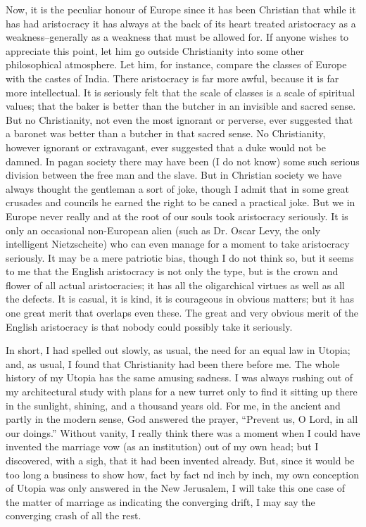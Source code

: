 \documentclass{book}
\begin{document}
Now, it is the peculiar honour of Europe since it has been Christian that while it has had aristocracy it has always at the back of its heart treated aristocracy as a weakness–generally as a weakness that must be allowed for. If anyone wishes to appreciate this point, let him go outside Christianity into some other philosophical atmosphere. Let him, for instance, compare the classes of Europe with the castes of India. There aristocracy is far more awful, because it is far more intellectual. It is seriously felt that the scale of classes is a scale of spiritual values; that the baker is better than the butcher in an invisible and sacred sense. But no Christianity, not even the most ignorant or perverse, ever suggested that a baronet was better than a butcher in that sacred sense. No Christianity, however ignorant or extravagant, ever suggested that a duke would not be damned. In pagan society there may have been (I do not know) some such serious division between the free man and the slave. But in Christian society we have always thought the gentleman a sort of joke, though I admit that in some great crusades and councils he earned the right to be caned a practical joke. But we in Europe never really and at the root of our souls took aristocracy seriously. It is only an occasional non-European alien (such as Dr. Oscar Levy, the only intelligent Nietzscheite) who can even manage for a moment to take aristocracy seriously. It may be a mere patriotic bias, though I do not think so, but it seems to me that the English aristocracy is not only the type, but is the crown and flower of all actual aristocracies; it has all the oligarchical virtues as well as all the defects. It is casual, it is kind, it is courageous in obvious matters; but it has one great merit that overlaps even these. The great and very obvious merit of the English aristocracy is that nobody could possibly take it seriously.

In short, I had spelled out slowly, as usual, the need for an equal law in Utopia; and, as usual, I found that Christianity had been there before me. The whole history of my Utopia has the same amusing sadness. I was always rushing out of my architectural study with plans for a new turret only to find it sitting up there in the sunlight, shining, and a thousand years old. For me, in the ancient and partly in the modern sense, God answered the prayer, “Prevent us, O Lord, in all our doings.” Without vanity, I really think there was a moment when I could have invented the marriage vow (as an institution) out of my own head; but I discovered, with a sigh, that it had been invented already. But, since it would be too long a business to show how, fact by fact nd inch by inch, my own conception of Utopia was only answered in the New Jerusalem, I will take this one case of the matter of marriage as indicating the converging drift, I may say the converging crash of all the rest.
\end{document}
